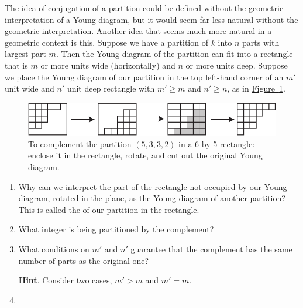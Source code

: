 \documentclass{book}
\begin{document}
\setcounter{cpjt}{308}
\addtocounter{cpjt}{-1}
\begin{activity}\label{activity-301}
\hypertarget{p-1516}{}%
The idea of conjugation of a partition could be defined without the geometric interpretation of a Young diagram, but it would seem far less natural without the geometric interpretation. Another idea that seems much more natural in a geometric context is this. Suppose we have a partition of \(k\) into \(n\) parts with largest part \(m\). Then the Young diagram of the partition can fit into a rectangle that is \(m\) or more units wide (horizontally) and \(n\) or more units deep. Suppose we place the Young diagram of our partition in the top left-hand corner of an \(m'\) unit wide and \(n'\) unit deep rectangle with \(m'\ge m\) and \(n' \ge n\), as in \hyperref[complementpartition]{Figure~\ref{complementpartition}}.%
\begin{figure}
\centering
\includegraphics[width=0.7\linewidth]{images/complementpartition}
\caption{To complement the partition \((5,3,3,2)\) in a 6 by 5 rectangle: enclose it in the rectangle, rotate, and cut out the original Young diagram.\label{complementpartition}}
\end{figure}
\begin{enumerate}[font=\bfseries,label=(\alph*),ref=\alph*]
\item\label{task-263} \hypertarget{p-1517}{}%
Why can we interpret the part of the rectangle not occupied by our Young diagram, rotated in the plane, as the Young diagram of another partition? This is called the  of our partition in the rectangle.%
\par\smallskip%
\noindent\item\label{task-264} \hypertarget{p-1519}{}%
What integer is being partitioned by the complement?%
\par\smallskip%
\noindent\item\label{task-265} \hypertarget{p-1521}{}%
What conditions on \(m'\) and \(n'\) guarantee that the complement has the same number of parts as the original one?%
\par\smallskip%
\noindent\textbf{Hint}.\hypertarget{hint-194}{}\quad%
\hypertarget{p-1522}{}%
Consider two cases, \(m' \gt m\) and \(m' = m\).%
\par\smallskip%
\noindent\item\label{task-266} \hypertarget{p-1524}{}%

\end{enumerate}
\end{activity}
\end{document}
